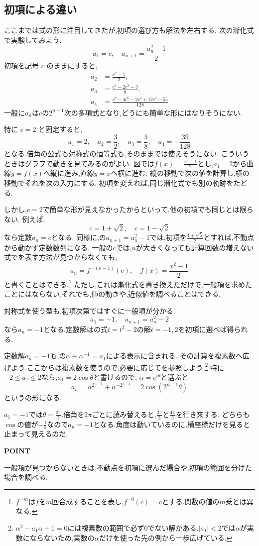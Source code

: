 \subsection{初項による違い}\label{節：初項による違い}

ここまでは式の形に注目してきたが,初項の選び方も解法を左右する.
次の漸化式で実験してみよう.
\[
  a_1=c,
  \quad
  a_{n+1}=\frac{a_n^2-1}{2}
\]
初項を記号 $c$ のままにすると,
\begin{align*}
  a_2&=\frac{c^2-1}{2},\\
  a_3&=\frac{c^4-2c^2-3}{8},\\
  a_4&=\frac{c^8-4c^6-2c^4+12c^2-55}{128}
\end{align*}
一般に$a_n$は$c$の$2^{n-1}$次の多項式となり,どうにも簡単な形にはなりそうにない.

特に $c=2$ と固定すると,
\[
  a_1=2,
  \quad
  a_2=\frac{3}{2},
  \quad
  a_3=\frac{5}{8},
  \quad
  a_4=-\frac{39}{128}
\]
となる.倍角の公式も対称式の恒等式も,そのままでは使えそうにない.
こういうときはグラフで動きを見てみるのがよい.
図では$f(x)=\frac{x^2-1}{2}$とし,$a_1=2$から曲線$y=f(x)$へ縦に進み,直線$y=x$へ横に進む.
縦の移動で次の値を計算し,横の移動でそれを次の入力にする.
初項を変えれば,同じ漸化式でも別の軌跡をたどる.
\BookFigCobweb

しかし,$c=2$で簡単な形が見えなかったからといって,他の初項でも同じとは限らない.
例えば,
\[
  c=1+\sqrt{2},
  \quad
  c=1-\sqrt{2}
\]
なら定数$a_n=c$となる.
同様に,の$a_{n+1}=a_n^2-1$では,初項を$\frac{1\pm\sqrt5}{2}$とすれば,不動点から動かず定数数列になる.
一般の$c$では,$n$が大きくなっても計算回数の増えない式でを表す方法が見つからなくても,
\[
  a_n=f^{\,\circ(n-1)}(c),
  \quad
  f(x)=\frac{x^2-1}{2}
\]
と書くことはできる.\footnote{$f^{\,\circ m}$は$f$を$m$回合成することを表し,$f^{\,\circ0}(c)=c$とする.関数の値の$m$乗とは異なる.}
ただし,これは漸化式を書き換えただけで,一般項を求めたことにはならない.それでも,値の動きや,近似値を調べることはできる.

対称式を使う型も,初項次第ではすぐに一般項が分かる.
\[
  a_1=-1,\quad a_{n+1}=a_n^2-2
\]
なら$a_n=-1$となる.定数解はの式$t=t^2-2$の解$t=-1,2$を初項に選べば得られる.

定数解$a_n=-1$も,の$\alpha+\alpha^{-1}=a_1$による表示に含まれる.
その計算を複素数へ広げよう.ここからは複素数を使うので,必要に応じてを参照しよう.\footnote{$\alpha^2-a_1\alpha+1=0$には複素数の範囲で必ず0でない解がある.$|a_1|<2$では$\alpha$が実数にならないため,実数の$\alpha$だけを使った先の例から一歩広げている.}
特に$-2\le a_1\le2$なら,$a_1=2\cos\theta$と書けるので,
$\alpha=e^{i\theta}$と選ぶと
\[
  a_n=\alpha^{2^{n-1}}+\alpha^{-2^{n-1}}=2\cos(2^{n-1}\theta)
\]
というの形になる.

$a_1=-1$では$\theta=\frac{2\pi}{3}$.倍角を$2\pi$ごとに読み替えると,$\frac{2\pi}{3}$と$\frac{4\pi}{3}$を行き来する.
どちらも$\cos$の値が$-\frac{1}{2}$なので$a_n=-1$となる.角度は動いているのに,横座標だけを見ると止まって見えるのだ.

\begin{bookpoint}
  \textbf{POINT}\par
  一般項が見つからないときは,不動点を初項に選んだ場合や,初項の範囲を分けた場合を調べる.
\end{bookpoint}
